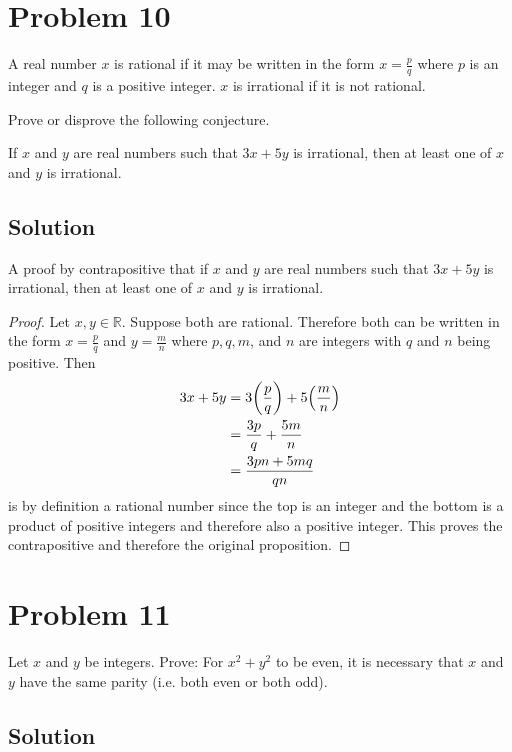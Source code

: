 \documentclass[12pt]{extarticle}
\begin{document}
\section*{Problem 10}

\begin{definition}
	A real number $x$ is rational if it may be written in the form $x = \frac{p}{q}$ where $p$ is an integer and $q$ is a positive integer. $x$ is irrational if it is not rational.
\end{definition}

Prove or disprove the following conjecture. 
\begin{conjecture}
  If $x$ and $y$ are real numbers such that $3x + 5y$ is irrational, then at least one of $x$ and $y$ is irrational.
\end{conjecture}

\subsection*{Solution}

A proof by contrapositive that if $x$ and $y$ are real numbers such that $3x + 5y$ is irrational, then at least one of $x$ and $y$ is irrational.
\begin{proof}
	Let $x,y \in \mathbb{R}$. Suppose both are rational. Therefore both can be written in the form $x = \frac{p}{q}$ and $y = \frac{m}{n}$ where $p,q,m$, and $n$ are integers with $q$ and $n$ being positive. Then
	\begin{align*}
		3x + 5y &= 3\qty(\frac{p}{q}) + 5 \qty(\frac{m}{n}) \\
						&= \frac{3p}{q} + \frac{5m}{n} \\
						&= \frac{3pn + 5mq}{qn}
	\end{align*}
	is by definition a rational number since the top is an integer and the bottom is a product of positive integers and therefore also a positive integer. This proves the contrapositive and therefore the original proposition.
\end{proof}

\section*{Problem 11}

Let $x$ and $y$ be integers. Prove: For $x^2 + y^2$ to be even, it is necessary that $x$ and $y$ have the same parity (i.e. both even or both odd).

\subsection*{Solution}
\end{document}
